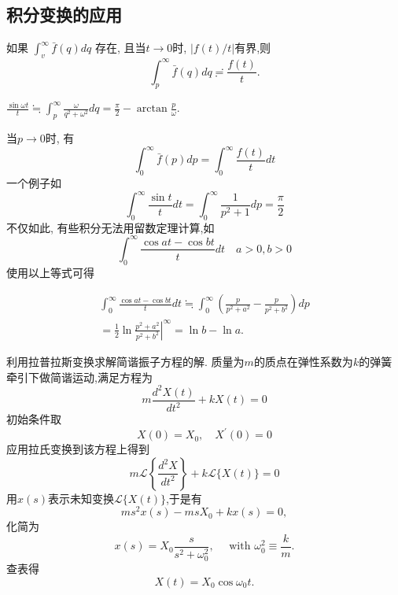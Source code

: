 \subsection{积分变换的应用}
\label{subsec:applications}



如果 $\int_v^{\infty} \bar{f}(q) d q$ 存在, 且当$t\to 0$时, $|f(t)/t|$有界,则
\begin{equation}
    \int_{p}^{\infty} \bar{f}(q) dq \risingdotseq \frac{f(t)}{t} . 
\end{equation}

$\frac{\sin \omega t}{t} \fallingdotseq \int_p^{\infty} \frac{\omega}{q^2+\omega^2} d q=\frac{\pi}{2}-\arctan \frac{p}{\omega}$.

当$p\to 0$时, 有
\begin{equation}
    \int_0^{\infty} \bar{f}(p) d p=\int_0^{\infty} \frac{f(t)}{t} d t
\end{equation}
一个例子如
$$
\int_0^{\infty} \frac{\sin t}{t} d t=\int_0^{\infty} \frac{1}{p^2+1} d p=\frac{\pi}{2}
$$
不仅如此, 有些积分无法用留数定理计算,如
$$
\int_0^{\infty} \frac{\cos a t-\cos b t}{t} d t \quad a>0, b>0
$$
使用以上等式可得

$$
\begin{gathered}
\int_0^{\infty} \frac{\cos a t-\cos b t}{t} d t \fallingdotseq \int_0^{\infty}\left(\frac{p}{p^2+a^2}-\frac{p}{p^2+b^2}\right) d p \\
=\left.\frac{1}{2} \ln \frac{p^2+a^2}{p^2+b^2}\right|^{\infty}=\ln b-\ln a .
\end{gathered}
$$


\begin{examplebox}{利用拉普拉斯变换求解简谐振子方程的解.}
    质量为$m$的质点在弹性系数为$k$的弹簧牵引下做简谐运动,满足方程为
    $$
m \frac{d^2 X(t)}{d t^2}+k X(t)=0
$$
初始条件取
$$
X(0)=X_0, \quad X^{\prime}(0)=0
$$
应用拉氏变换到该方程上得到
$$
m \mathcal{L}\left\{\frac{d^2 X}{d t^2}\right\}+k \mathcal{L}\{X(t)\}=0
$$
用$x(s)$表示未知变换$\mathcal{L}\{ X(t)\}$,于是有
$$
m s^2 x(s)-m s X_0+k x(s)=0 ,
$$
化简为
$$
x(s)=X_0 \frac{s}{s^2+\omega_0^2}, \quad \text { with } \omega_0^2 \equiv \frac{k}{m} .
$$
查表得
$$
X(t)=X_0 \cos \omega_0 t .
$$
\end{examplebox}